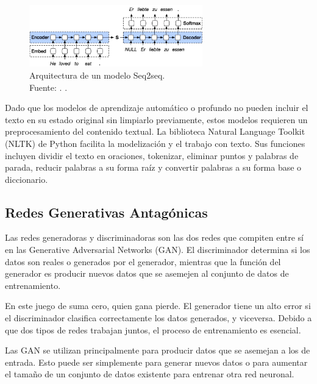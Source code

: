 \begin{itemize}
	\begin{figure}[!ht]
		\begin{center}
			\includegraphics[width=0.67\textwidth]{2/figures/encoder-decoder.jpg}
			\caption[Arquitectura de un modelo Seq2seq]{Arquitectura de un modelo Seq2seq.\\
			Fuente: \cite{tec_kostadinov2019seq2seq}. .}
			\label{2:fig46}
		\end{center}
	\end{figure}	
\end{itemize}

Dado que los modelos de aprendizaje automático o profundo no pueden incluir el texto en su estado original sin limpiarlo previamente, estos modelos requieren un preprocesamiento del contenido textual. La biblioteca Natural Language Toolkit (NLTK) de Python facilita la modelización y el trabajo con texto. Sus funciones incluyen dividir el texto en oraciones, tokenizar, eliminar puntos y palabras de parada, reducir palabras a su forma raíz y convertir palabras a su forma base o diccionario. \parencite{bk_brownlee2017deeplearning_nlp}

\subsection{Redes Generativas Antagónicas}

Las redes generadoras y discriminadoras son las dos redes que compiten entre sí en las Generative Adversarial Networks (GAN). El discriminador determina si los datos son reales o generados por el generador, mientras que la función del generador es producir nuevos datos que se asemejen al conjunto de datos de entrenamiento. \parencite{tec_goodfellow2014gan}

En este juego de suma cero, quien gana pierde. El generador tiene un alto error si el discriminador clasifica correctamente los datos generados, y viceversa. Debido a que dos tipos de redes trabajan juntos, el proceso de entrenamiento es esencial. \parencite{tec_goodfellow2014gan}

Las GAN se utilizan principalmente para producir datos que se asemejan a los de entrada. Esto puede ser simplemente para generar nuevos datos o para aumentar el tamaño de un conjunto de datos existente para entrenar otra red neuronal. \parencite{tec_goodfellow2014gan}

